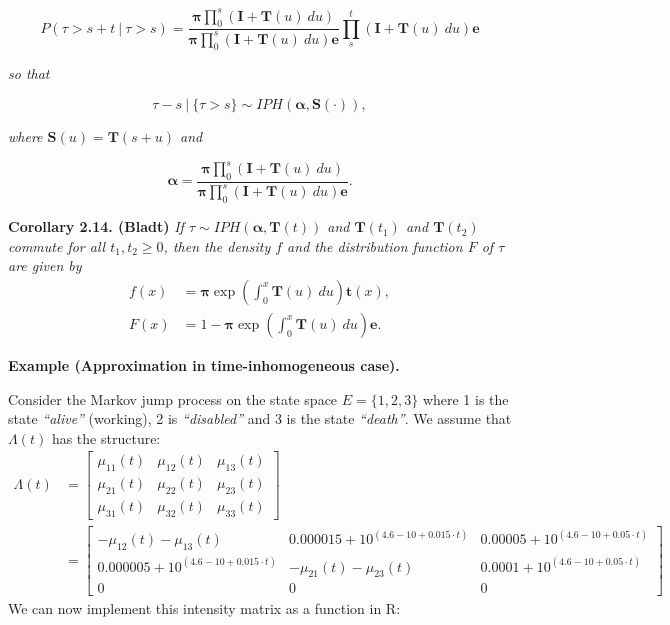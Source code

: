 \documentclass[a4paper,12pt,openany]{book}
\begin{document}
\[
P(\tau >s+t\ \vert\ \tau >s)=\frac{\mathbf{\pi}\prod_0^s(\mathbf{I}+\mathbf{T}(u)\ du)}{\mathbf{\pi}\prod_0^s(\mathbf{I}+\mathbf{T}(u)\ du)\mathbf{e}}\prod_s^t(\mathbf{I}+\mathbf{T}(u)\ du)\mathbf{e}
\]

\emph{so that}

\[
\tau-s\ \vert\ \{\tau>s\}\sim IPH(\mathbf{\alpha},\mathbf{S}(\cdot)),
\]

\emph{where \(\mathbf{S}(u)=\mathbf{T}(s+u)\) and }

\[
\mathbf{\alpha}=\frac{\mathbf{\pi}\prod_0^s(\mathbf{I}+\mathbf{T}(u)\ du)}{\mathbf{\pi}\prod_0^s(\mathbf{I}+\mathbf{T}(u)\ du)\mathbf{e}}.
\]

\textbf{Corollary 2.14. (Bladt)} \emph{If \(\tau\sim IPH(\mathbf{\alpha},\mathbf{T}(t))\) and \(\mathbf{T}(t_1)\) and \(\mathbf{T}(t_2)\) commute for all \(t_1,t_2\ge 0\), then the density \(f\) and the distribution function \(F\) of \(\tau\) are given by}
\begin{align*}
f(x)&=\mathbf{\pi}\exp\left(\int_0^x\mathbf{T}(u)\ du\right)\mathbf{t}(x),\\
F(x)&=1-\mathbf{\pi}\exp\left(\int_0^x\mathbf{T}(u)\ du\right)\mathbf{e}.
\end{align*}

\textbf{Example (Approximation in time-inhomogeneous case).}

Consider the Markov jump process on the state space \(E=\{1,2,3\}\) where 1 is the state \emph{``alive''} (working), 2 is \emph{``disabled''} and 3 is the state \emph{``death''}. We assume that \(\Lambda(t)\) has the structure:
\begin{align*}
\Lambda(t)&=\begin{bmatrix}
\mu_{11}(t) & \mu_{12}(t) & \mu_{13}(t)\\
\mu_{21}(t) & \mu_{22}(t) & \mu_{23}(t)\\
\mu_{31}(t) & \mu_{32}(t) & \mu_{33}(t)
\end{bmatrix}\\
&=
\begin{bmatrix}
-\mu_{12}(t)-\mu_{13}(t) &  0.000015 + 10^{(4.6-10+0.015\cdot t)} & 0.00005 + 10^{(4.6-10+0.05\cdot t)}\\
0.000005 + 10^{(4.6-10+0.015\cdot t)} & -\mu_{21}(t)-\mu_{23}(t) & 0.0001 + 10^{(4.6-10+0.05\cdot t)}\\
0 & 0 & 0
\end{bmatrix}
\end{align*}
We can now implement this intensity matrix as a function in R:
\end{document}

